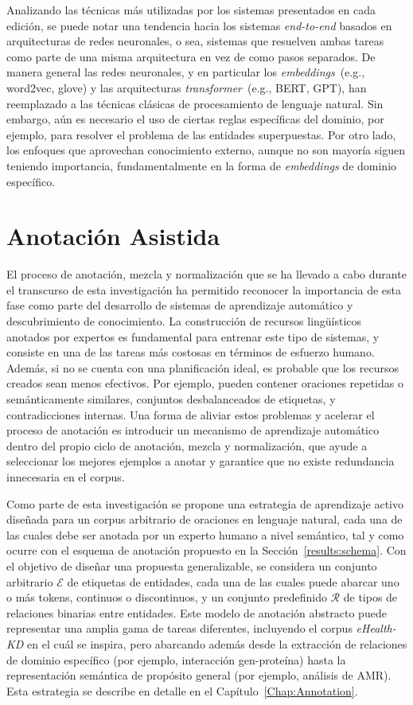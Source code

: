 Analizando las técnicas más utilizadas por los sistemas presentados en cada edición, se puede notar una tendencia hacia los sistemas \textit{end-to-end} basados en arquitecturas de redes neuronales, o sea, sistemas que resuelven ambas tareas como parte de una misma arquitectura en vez de como pasos separados.
De manera general las redes neuronales, y en particular los \textit{embeddings}~(e.g., word2vec, glove) y las arquitecturas \textit{transformer}~(e.g., BERT, GPT), han reemplazado a las técnicas clásicas de procesamiento de lenguaje natural.
Sin embargo, aún es necesario el uso de ciertas reglas específicas del dominio, por ejemplo, para resolver el problema de las entidades superpuestas.
Por otro lado, los enfoques que aprovechan conocimiento externo, aunque no son mayoría siguen teniendo importancia, fundamentalmente en la forma de \textit{embeddings} de dominio específico.

\section{Anotación Asistida}\label{results:assisted-ann}

El proceso de anotación, mezcla y normalización que se ha llevado a cabo durante el transcurso de esta investigación ha permitido reconocer la importancia de esta fase como parte del desarrollo de sistemas de aprendizaje automático y descubrimiento de conocimiento.
La construcción de recursos lingüísticos anotados por expertos es fundamental para entrenar este tipo de sistemas, y consiste en una de las tareas más costosas en términos de esfuerzo humano.
Además, si no se cuenta con una planificación ideal, es probable que los recursos creados sean menos efectivos. Por ejemplo, pueden contener oraciones repetidas o semánticamente similares, conjuntos desbalanceados de etiquetas, y contradicciones internas.
Una forma de aliviar estos problemas y acelerar el proceso de anotación es introducir un mecanismo de aprendizaje automático dentro del propio ciclo de anotación, mezcla y normalización, que ayude a seleccionar los mejores ejemplos a anotar y garantice que no existe redundancia innecesaria en el corpus.

Como parte de esta investigación se propone una estrategia de aprendizaje activo diseñada para un corpus arbitrario de oraciones en lenguaje natural, cada una de las cuales debe ser anotada por un experto humano a nivel semántico, tal y como ocurre con el esquema de anotación propuesto en la Sección~\ref{results:schema}.
Con el objetivo de diseñar una propuesta generalizable, se considera un conjunto arbitrario $\mathcal{E}$ de etiquetas de entidades, cada una de las cuales puede abarcar uno o más tokens, continuos o discontinuos,
y un conjunto predefinido $\mathcal{R}$ de tipos de relaciones binarias entre entidades.
Este modelo de anotación abstracto puede representar una amplia gama de tareas diferentes, incluyendo el corpus \textit{eHealth-KD} en el cuál se inspira, pero abarcando además desde la extracción de relaciones de  dominio específico (por ejemplo, interacción gen-proteína) hasta la representación semántica de propósito general (por ejemplo, análisis de AMR).
Esta estrategia se describe en detalle en el Capítulo~\ref{Chap:Annotation}.

